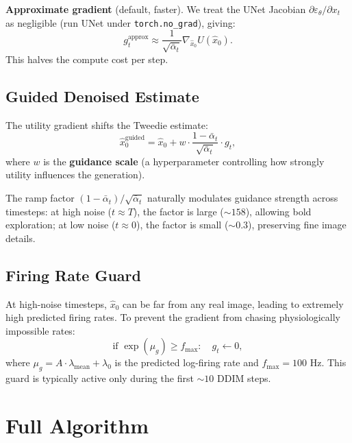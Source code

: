 \documentclass[11pt]{article}
\begin{document}
\medskip
\noindent\textbf{Approximate gradient} (default, faster).
We treat the UNet Jacobian $\partial \varepsilon_\theta / \partial x_t$ as
negligible (run UNet under \texttt{torch.no\_grad}), giving:
\begin{equation}\label{eq:approx_grad}
  g_t^{\text{approx}}
  \approx \frac{1}{\sqrt{\bar\alpha_t}} \nabla_{\hat x_0} U(\hat x_0).
\end{equation}
This halves the compute cost per step.

\subsection{Guided Denoised Estimate}

The utility gradient shifts the Tweedie estimate:
\begin{equation}\label{eq:guided_x0}
  \hat x_0^{\text{guided}}
  = \hat x_0
  + w \cdot \frac{1 - \bar\alpha_t}{\sqrt{\bar\alpha_t}} \cdot g_t,
\end{equation}
where $w$ is the \textbf{guidance scale} (a hyperparameter controlling how
strongly utility influences the generation).

The ramp factor $(1 - \bar\alpha_t) / \sqrt{\bar\alpha_t}$
naturally modulates guidance strength across timesteps:
at high noise ($t \approx T$), the factor is large ($\sim 158$), allowing bold
exploration; at low noise ($t \approx 0$), the factor is small ($\sim 0.3$),
preserving fine image details.

\subsection{Firing Rate Guard}

At high-noise timesteps, $\hat x_0$ can be far from any real image, leading to
extremely high predicted firing rates.
To prevent the gradient from chasing physiologically impossible rates:
\[
  \text{if } \exp(\mu_g) \geq f_{\max}: \quad g_t \leftarrow 0,
\]
where $\mu_g = A \cdot \lambda_{\text{mean}} + \lambda_0$ is the predicted
log-firing rate and $f_{\max} = 100$ Hz.
This guard is typically active only during the first $\sim 10$ DDIM steps.


\section{Full Algorithm}
\end{document}
